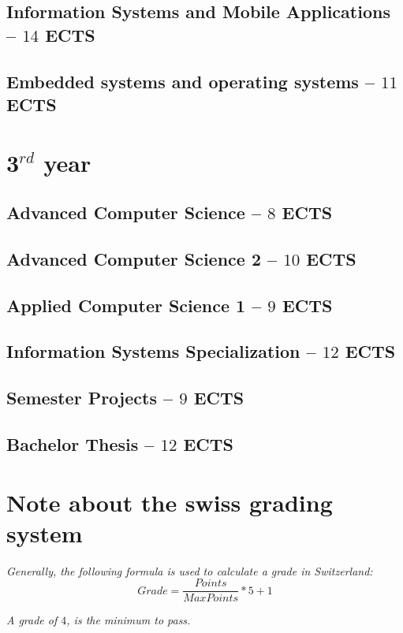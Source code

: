 \documentclass[11pt]{article}
\newcommand{\module}[2]{
    \subsection[#1]{#1 \small -- $#2$ ECTS}
}
\begin{document}
\module{Information Systems and Mobile Applications}{14}
\pagebreak

\pagebreak
\module{Embedded systems and operating systems}{11}


%
%
\section{3$^{rd}$ year}
\module{Advanced Computer Science}{8}
\pagebreak
\pagebreak

\module{Advanced Computer Science 2}{10}
\pagebreak

\pagebreak
\module{Applied Computer Science 1}{9}

\module{Information Systems Specialization}{12}

\pagebreak
\module{Semester Projects}{9}

\module{Bachelor Thesis}{12}

%
%
\vspace{5em}
\section{Note about the swiss grading system}
\textit{Generally, the following formula is used to calculate a grade in Switzerland:}
\begin{equation}
    Grade = \frac{Points}{MaxPoints} * 5 + 1
\end{equation}

\textit{
A grade of $4$, is the minimum to pass.
}
\end{document}
